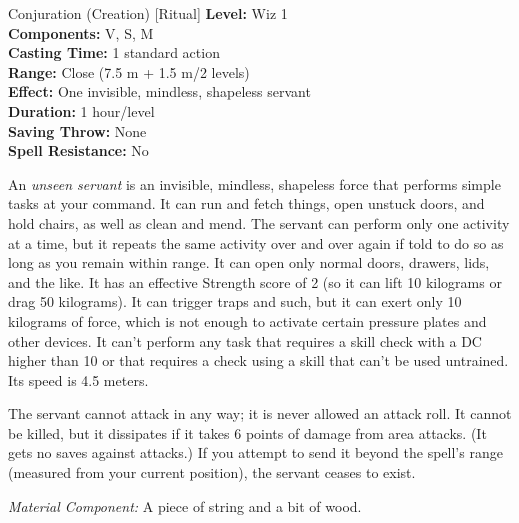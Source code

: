 {Conjuration (Creation) [Ritual]}
{
	\textbf{Level:}
	Wiz 1\\
	\textbf{Components:}
	V, S, M\\
	\textbf{Casting Time:}
	1 standard action\\
	\textbf{Range:}
	Close (7.5 m + 1.5 m/2 levels)\\
	\textbf{Effect:}
	One invisible, mindless, shapeless servant\\
	\textbf{Duration:}
	1 hour/level\\
	\textbf{Saving Throw:}
	None\\
	\textbf{Spell Resistance:}
	No\\
}
{
	An \emph{unseen servant} is an invisible, mindless, shapeless force that performs simple tasks at your command. It can run and fetch things, open unstuck doors, and hold chairs, as well as clean and mend. The servant can perform only one activity at a time, but it repeats the same activity over and over again if told to do so as long as you remain within range. It can open only normal doors, drawers, lids, and the like. It has an effective Strength score of 2 (so it can lift 10 kilograms or drag 50 kilograms). It can trigger traps and such, but it can exert only 10 kilograms of force, which is not enough to activate certain pressure plates and other devices. It can't perform any task that requires a skill check with a DC higher than 10 or that requires a check using a skill that can't be used untrained. Its speed is 4.5 meters.

	The servant cannot attack in any way; it is never allowed an attack roll. It cannot be killed, but it dissipates if it takes 6 points of damage from area attacks. (It gets no saves against attacks.) If you attempt to send it beyond the spell's range (measured from your current position), the servant ceases to exist.

	\textit{Material Component:}
	A piece of string and a bit of wood.

}
